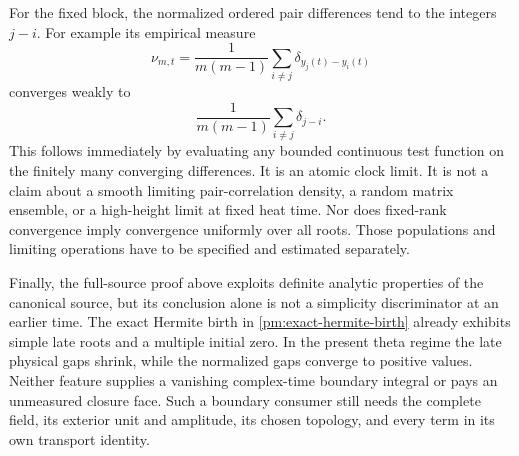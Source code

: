 For the fixed block, the normalized ordered pair differences tend to the
integers \(j-i\).  For example its empirical measure
\[
 \nu_{m,t}=\frac1{m(m-1)}\sum_{i\ne j}\delta_{y_j(t)-y_i(t)}
\]
converges weakly to
\[
 \frac1{m(m-1)}\sum_{i\ne j}\delta_{j-i}.
\]
This follows immediately by evaluating any bounded continuous test
function on the finitely many converging differences.  It is an atomic
clock limit.  It is not a claim about a smooth limiting pair-correlation
density, a random matrix ensemble, or a high-height limit at fixed heat
time.  Nor does fixed-rank convergence imply convergence uniformly over
all roots.  Those populations and limiting operations have to be
specified and estimated separately.

Finally, the full-source proof above exploits definite analytic
properties of the canonical source, but its conclusion alone is not a
simplicity discriminator at an earlier time.  The exact Hermite birth in
\eqref{pm:exact-hermite-birth} already exhibits simple late roots and a
multiple initial zero.  In the present theta regime the late physical gaps
shrink, while the normalized gaps converge to positive values.  Neither
feature supplies a vanishing complex-time boundary integral or pays an
unmeasured closure face.  Such a boundary consumer still needs the
complete field, its exterior unit and amplitude, its chosen topology,
and every term in its own transport identity.
